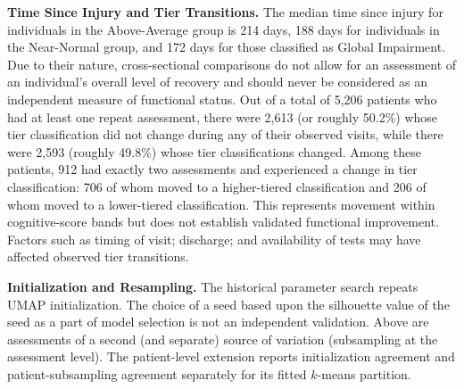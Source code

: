 \textbf{Time Since Injury and Tier Transitions.} The median time since injury for individuals in the Above-Average group is 214 days, 188 days for individuals in the Near-Normal group, and 172 days for those classified as Global Impairment. Due to their nature, cross-sectional comparisons do not allow for an assessment of an individual's overall level of recovery and should never be considered as an independent measure of functional status. Out of a total of 5,206 patients who had at least one repeat assessment, there were 2,613 (or roughly 50.2\%) whose tier classification did not change during any of their observed visits, while there were 2,593 (roughly 49.8\%) whose tier classifications changed. Among these patients, 912 had exactly two assessments and experienced a change in tier classification: 706 of whom moved to a higher-tiered classification and 206 of whom moved to a lower-tiered classification. This represents movement within cognitive-score bands but does not establish validated functional improvement. Factors such as timing of visit; discharge; and availability of tests may have affected observed tier transitions.

\textbf{Initialization and Resampling.} The historical parameter search repeats UMAP initialization. The choice of a seed based upon the silhouette value of the seed as a part of model selection is not an independent validation. Above are assessments of a second (and separate) source of variation (subsampling at the assessment level). The patient-level extension reports initialization agreement and patient-subsampling agreement separately for its fitted \(k\)-means partition.

